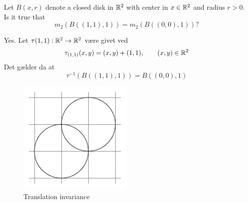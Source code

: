\begin{problem}
Let \(B(x,r)\) denote a closed disk in \({\mathbb{R}}^2\) with center in \(x\in{\mathbb{R}}^2\) and radius \(r>0\). Is it true that
\[
	m_2(B((1,1),1))=m_2(B((0,0),1))?
\]

\end{problem}
\begin{solution}
Yes. Let \(\tau(1,1):{\mathbb{R}}^2 \rightarrow{\mathbb{R}}^2\) være givet ved
\[
	\tau_{(1,1)}(x,y)=(x,y)+(1,1),\qquad(x,y)\in {\mathbb{R}}^2
\]
Det gælder da at
\[
	\tau^{-1}(B((1,1),1))=B((0,0),1)
\]
\begin{figure}[htbp]
	\centering
	\includegraphics[width=0.5\textwidth]{fig/exam-1213.pdf}
	\caption{Translation invariance}
	\label{fig:translation-invariance}
\end{figure}
\end{solution}
